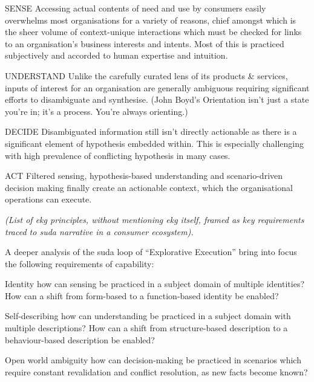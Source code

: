 \begin{basedescript}{%
    \desclabelstyle{\multilinelabel}
    \desclabelwidth{3cm}
}
    \item[SENSE] Accessing actual contents of need and use by consumers easily overwhelms most organisations
    for a variety of reasons, chief amongst which is the sheer volume of context-unique interactions which
    must be checked for links to an organisation’s business interests and intents.
    Most of this is practiced subjectively and accorded to human expertise and intuition.
    \item[UNDERSTAND] Unlike the carefully curated lens of its products \& services,
    inputs of interest for an organisation are generally ambiguous requiring significant efforts to
    disambiguate and synthesise.
    (John Boyd’s Orientation isn’t just a state you’re in; it’s a process. You’re always orienting.)
    \item[DECIDE] Disambiguated information still isn’t directly actionable as there is a significant element of
    hypothesis embedded within.
    This is especially challenging with high prevalence of conflicting hypothesis in many cases.
    \item[ACT] Filtered sensing, hypothesis-based understanding and scenario-driven decision making finally
    create an actionable context, which the organisational operations can execute.
\end{basedescript}

\textit{(List of \gls{ekg} principles, without mentioning \gls{ekg} itself,
    framed as key requirements traced to \gls{suda} narrative in a consumer ecosystem).}

A deeper analysis of the \gls{suda} loop of “Explorative Execution” bring into focus the following requirements of capability:

\begin{basedescript}{%
    \desclabelstyle{\multilinelabel}
    \desclabelwidth{3cm}
}
    \item[Identity] how can sensing be practiced in a subject domain of multiple identities?
    How can a shift from form-based to a function-based identity be enabled?
    \item[Self-describing] how can understanding be practiced in a subject domain with multiple descriptions?
    How can a shift from structure-based description to a behaviour-based description be enabled?
    \item[Open world ambiguity] how can decision-making be practiced in scenarios which require constant
    revalidation and conflict resolution, as new facts become known?
\end{basedescript}


